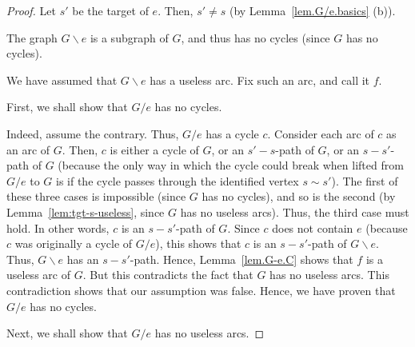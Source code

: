 \documentclass[12pt]{amsart}
\theoremstyle{definition}
\begin{document}
\begin{proof}
Let $s'$ be the target of $e$.
Then, $s' \neq s$ (by Lemma~\ref{lem.G/e.basics} (b)).

The graph $G \backslash e$ is a subgraph of $G$, and thus has
no cycles (since $G$ has no cycles).

We have assumed that $G \backslash e$ has a useless arc.
Fix such an arc, and call it $f$.

First, we shall show that $G / e$ has no cycles.

Indeed, assume the contrary. Thus, $G / e$ has a cycle $c$.
Consider each arc of $c$ as an arc of $G$.
Then, $c$ is either a cycle of $G$, or an $s'-s$-path of $G$,
or an $s-s'$-path of $G$
(because the only way in which the cycle could break when
lifted from $G / e$ to $G$ is if the cycle passes through
the identified vertex $s \sim s'$).
The first of these three cases is impossible (since $G$ has no cycles),
and so is the second (by Lemma~\ref{lem:tgt-s-useless}, since $G$ has no useless arcs).
Thus, the third case must hold.
In other words, $c$ is an $s-s'$-path of $G$.
Since $c$ does not contain $e$ (because $c$ was originally a cycle of $G / e$),
this shows that $c$ is an $s-s'$-path of $G \backslash e$.
Thus, $G \backslash e$ has an $s-s'$-path.
Hence, Lemma~\ref{lem.G-e.C} shows that
$f$ is a useless arc of $G$.
But this contradicts the fact that $G$ has no useless arcs.
This contradiction shows that our assumption was false.
Hence, we have proven that $G / e$ has no cycles.

Next, we shall show that $G / e$ has no useless arcs.



\end{proof}
\end{document}
